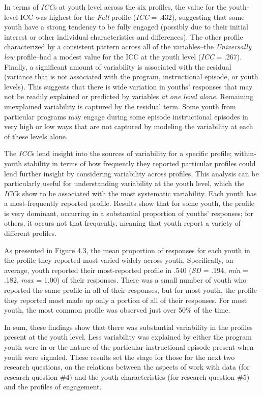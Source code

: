 \documentclass[]{book}
\theoremstyle{definition}
\theoremstyle{definition}
\theoremstyle{definition}
\theoremstyle{remark}
\begin{document}
In terms of \emph{ICC}s at youth level across the six profiles, the
value for the youth-level ICC was highest for the \emph{Full} profile
(\emph{ICC} = .432), suggesting that some youth have a strong tendency
to be fully engaged (possibly due to their initial interest or other
individual characteristics and differences). The other profile
characterized by a consistent pattern across all of the variables--the
\emph{Universally low} profile--had a modest value for the ICC at the
youth level (\emph{ICC} = .267). Finally, a significant amount of
variability is associated with the residual (variance that is not
associated with the program, instructional episode, or youth levels).
This suggests that there is wide variation in youths' responses that may
not be readily explained or predicted by variables \emph{at one level
alone}. Remaining unexplained variability is captured by the residual
term. Some youth from particular programs may engage during some episode
instructional episodes in very high or low ways that are not captured by
modeling the variability at each of these levels alone.

The \emph{ICC}s lend insight into the sources of variability for a
specific profile; within-youth stability in terms of how frequently they
reported particular profiles could lend further insight by considering
variability across profiles. This analysis can be particularly useful
for understanding variability at the youth level, which the \emph{ICC}s
show to be associated with the most systematic variability. Each youth
has a most-frequently reported profile. Results show that for some
youth, the profile is very dominant, occurring in a substantial
proportion of youths' responses; for others, it occurs not that
frequently, meaning that youth report a variety of different profiles.

As presented in Figure 4.3, the mean proportion of responses for each
youth in the profile they reported most varied widely across youth.
Specifically, on average, youth reported their most-reported profile in
.540 (\emph{SD} = .194, \emph{min} = .182, \emph{max} = 1.00) of their
responses. There was a small number of youth who reported the same
profile in all of their responses, but for most youth, the profile they
reported most made up only a portion of all of their responses. For most
youth, the most common profile was observed just over 50\% of the time.

In sum, these findings show that there was substantial variability in
the profiles present at the youth level. Less variability was explained
by either the program youth were in or the nature of the particular
instructional episode present when youth were signaled. These results
set the stage for those for the next two research questions, on the
relations between the aspects of work with data (for research question
\#4) and the youth characteristics (for research question \#5) and the
profiles of engagement.
\end{document}
